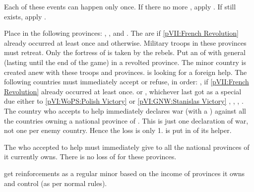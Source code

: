

\aparag Each of these events can happen only once.
\bparag If there no more \payspologne, apply .
\bparag If \payspologne still exists, apply .



\phevnt
\aparag Place \REVOLT in the following provinces: \provinceLietuva,
\provinceMazowia, \provinceLublin and \provinceWielkopolska.
\bparag The \REVOLT are \faceplus if \ref{pVII:French Revolution} already
occurred at least once and \facemoins otherwise.
\bparag Military troops in these provinces must retreat.
\bparag Only the fortress of \villeVarsovie is taken by the rebels.
\bparag Put an \ARMY\facemoins of \payspologne with general
 (lasting until the end of the game) in a revolted
province.
\aparag The minor country \payspologne is created anew with these troops and
provinces.
\aparag \payspologne is looking for a foreign help. The following countries
must immediately accept or refuse, in order:
\bparag \FRA, if \ref{pVII:French Revolution} already occurred at least once.
\bparag \FRA or \SUE, whichever last got \payspologne as a special \EG due
either to \ref{pVI:WoPS:Polish Victory} or \ref{pVI:GNW:Stanislas Victory}
\bparag \FRA, \SUE, \AUS, \PRU.
\aparag The country who accepts to help \payspologne immediately declares war
(with a \CB) against all the countries owning a national province of \POL.
\bparag This is just one declaration of war, not one per enemy country. Hence
the \STAB loss is only 1.
\aparag \payspologne is put in \EG of its helper.

\phdipl
\aparag The \MAJ who accepted to help \payspologne must immediately give to
\payspologne all the national provinces of \POL it currently owns.
\bparag There is no loss of \VP for these provinces.

\phadm
\aparag \payspologne get reinforcements as a regular minor based on the income
of provinces it owns and control (as per normal rules).

